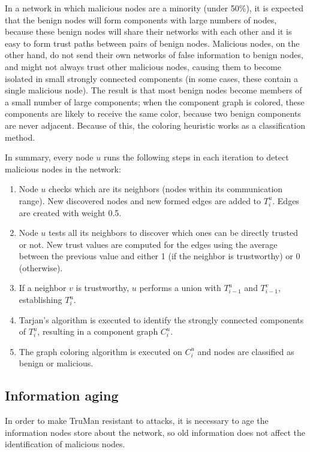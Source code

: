 In a network in which malicious nodes are a minority (under 50\%), it is expected that the benign nodes will form components with large numbers of nodes, because these benign nodes will share their networks with each other and it is easy to form trust paths between pairs of benign nodes.
Malicious nodes, on the other hand, do not send their own networks of false information to benign nodes, and might not always trust other malicious nodes, causing them to become isolated in small strongly connected components (in some cases, these contain a single malicious node).
The result is that most benign nodes become members of a small number of large components; when the component graph is colored, these components are likely to receive the same color, because two benign components are never adjacent.
Because of this, the coloring heuristic works as a classification method.

In summary, every node $u$ runs the following steps in each iteration to detect malicious nodes in the network:

\begin{enumerate}
	\item Node $u$ checks which are its neighbors (nodes within its communication range).
		  New discovered nodes and new formed edges are added to $T^u_i$.
		  Edges are created with weight 0.5.
	\item Node $u$ tests all its neighbors to discover which ones can be directly trusted or not.
		  New trust values are computed for the edges using the average between the previous value and either 1 (if the neighbor is trustworthy) or 0 (otherwise).
	\item If a neighbor $v$ is trustworthy, $u$ performs a union with $T^u_{i-1}$ and $T^v_{i-1}$, establishing $T^u_i$.
	\item Tarjan's algorithm is executed to identify the strongly connected components of $T^u_i$, resulting in a component graph $C^u_i$.
	\item The graph coloring algorithm is executed on $C^u_i$ and nodes are classified as benign or malicious.
\end{enumerate}

\subsection{Information aging}

In order to make TruMan resistant to attacks, it is necessary to age the information nodes store about the network, so old information does not affect the identification of malicious nodes.

